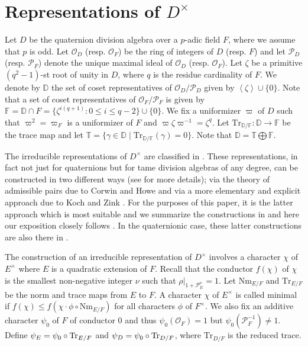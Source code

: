 \documentclass[12pt]{amsart}
\theoremstyle{definition}
\theoremstyle{remark}
\begin{document}
\section{Representations of $D^\times$}\label{prelim}
Let $D$ be the quaternion division algebra over a $p$-adic field $F$, where we assume that $p$ is odd. Let $\mathcal O_D$ (resp. $\mathcal O_F$) be the ring of integers of $D$ (resp. $F$) and let $\mathcal P_D$ (resp. $\mathcal P_F$) denote the unique maximal ideal of $\mathcal O_D$ (resp. $\mathcal O_F$). Let $\zeta$ be a primitive $(q^2 - 1)$-st root of unity in $D$, where $q$ is the residue cardinality of $F$. We denote by $\mathbb D$ the set of coset representatives of $\mathcal{O}_D/\mathcal{P}_D$ given by $\left\langle \zeta \right\rangle \cup \{ 0\}$. Note that a set of coset representatives of $\mathcal O_F/\mathcal P_F$ is given by 
$\mathbb F = \mathbb D \cap F = \{ \zeta^{i(q+1)}: 0 \leq i \leq q-2 \} \cup \{0\}$. We fix a uniformizer $\varpi$ of $D$ such that $\varpi^2 = \varpi_F$ is a uniformizer of $F$ and $\varpi \zeta \varpi^{-1}= \zeta^q$. Let $\mathrm{Tr}_{\mathbb D/\mathbb F}: \mathbb D \rightarrow \mathbb F$ be the trace map and let $\mathbb T = \{\gamma \in \mathbb D \mid \mathrm{Tr}_{\mathbb D/\mathbb F}(\gamma) = 0\}$. Note that $\mathbb D = \mathbb T \bigoplus \mathbb F$.

The irreducible representations of $D^\times$ are classified in \cite{gg68}. These representations, in fact not just for quaternions but for tame division algebras of any degree, can be constructed in two different ways (see \cite[Chapter 8]{bf83} for more details); via the theory of admissible pairs due to Corwin and Howe \cite{ch77} and via a more elementary and explicit approach due to Koch and Zink \cite{kz80}. For the purposes of this paper, it is the latter approach which is most suitable and we summarize the constructions in \cite{kz80,bf83} and here our exposition closely follows \cite[\S1]{hsy93}. In the quaternionic case, these latter constructions are also there in \cite[\S 3.4, \S 3.5, \S 3.6, \S 4.5]{gk80}.

The construction of an irreducible representation of $D^\times$ involves a character $\chi$ of $E^\times$ where $E$ is a quadratic extension of $F$. Recall that the conductor $f(\chi)$ of $\chi$ is the smallest non-negative integer $\nu$ such that $\rho|_{1 + \mathcal{P}_E^{\nu}} = 1$. Let $\mathrm{Nm}_{E/F}$ and $\mathrm{Tr}_{E/F}$ be the norm and trace maps from $E$ to $F$. A character $\chi$ of $E^\times$ is called minimal if $f(\chi) \leq f(\chi \cdot \phi \circ \mathrm{Nm}_{E/F})$ for all characters $\phi$ of $F^\times$. We also fix an additive character $\psi_0$ of $F$ of conductor $0$ and thus $\psi_0(\mathcal{O}_F) = 1$ but $\psi_0(\mathcal{P}_F^{-1}) \neq 1$. Define $\psi_E = \psi_0 \circ {\rm Tr}_{E/F}$ and $\psi_D = \psi_0 \circ {\rm Tr}_{D/F}$, where $\mathrm{Tr}_{D/F}$ is the reduced trace.
\end{document}
